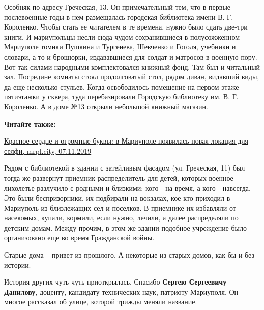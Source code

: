 Особняк по адресу Греческая, 13. Он примечательный тем, что в первые
послевоенные годы в нем размещалась городская библиотека имени В. Г. Короленко.
Чтобы стать ее читателем в те времена, нужно было сдать две-три книги. И
мариупольцы несли сюда чудом сохранившиеся в полусожженном Мариуполе томики
Пушкина и Тургенева, Шевченко и Гоголя, учебники и словари, а то и брошюрки,
издававшиеся для солдат и матросов в военную пору. Вот так силами народными
комплектовался книжный фонд. Там был и читальный зал. Посредине комнаты стоял
продолговатый стол, рядом диван, видавший виды, да еще несколько стульев. Когда
освободилось помещение на первом этаже пятиэтажки у сквера, туда перебазировали
Городскую библиотеку им. В. Г. Короленко. А в доме №13 открыли небольшой
книжный магазин.

\textbf{Читайте также:} 

\href{https://mrpl.city/news/view/krasnoe-serdtse-i-ogromnye-bukvy-v-mariupole-poyavilas-novaya-lokatsiya-dlya-selfi-fotofakt}{%
Красное сердце и огромные буквы: в Мариуполе появилась новая локация для селфи, mrpl.city, 07.11.2019}


Рядом с библиотекой в здании с затейливым фасадом (ул. Греческая, 11) был тогда
же развернут приемник-распределитель для детей, которых военное лихолетье
разлучило с родными и близкими: кого - на время, а кого - навсегда. Это были
беспризорники, их подбирали на вокзалах, кое-кто приходил в Мариуполь из
близлежащих сел и поселков. В приемнике их избавляли от насекомых, купали,
кормили, если нужно, лечили, а далее распределяли по детским домам. Между
прочим, в этом же здании подобное учреждение было организовано еще во время
Гражданской войны.

Старые дома – привет из прошлого. А некоторые из старых домов, как бы и без
истории.

История других чуть-чуть приоткрылась. Спасибо \textbf{Сергею Сергеевичу Данилову},
доценту, кандидату технических наук, патриоту Мариуполя. Он многое рассказал об
улице, которой трижды меняли название.
